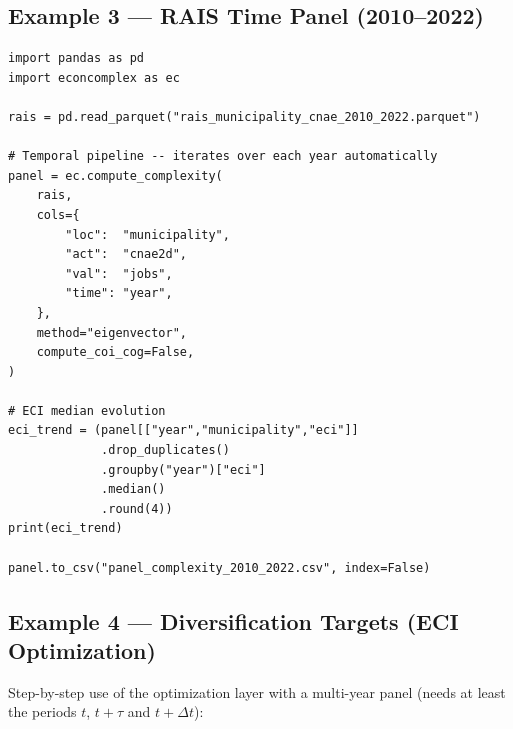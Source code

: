 \documentclass[12pt, a4paper]{article}
\begin{document}
\subsection{Example 3 --- RAIS Time Panel (2010--2022)}

\begin{lstlisting}[caption={Pipeline with panel data --- multiple periods}]
import pandas as pd
import econcomplex as ec

rais = pd.read_parquet("rais_municipality_cnae_2010_2022.parquet")

# Temporal pipeline -- iterates over each year automatically
panel = ec.compute_complexity(
    rais,
    cols={
        "loc":  "municipality",
        "act":  "cnae2d",
        "val":  "jobs",
        "time": "year",
    },
    method="eigenvector",
    compute_coi_cog=False,
)

# ECI median evolution
eci_trend = (panel[["year","municipality","eci"]]
             .drop_duplicates()
             .groupby("year")["eci"]
             .median()
             .round(4))
print(eci_trend)

panel.to_csv("panel_complexity_2010_2022.csv", index=False)
\end{lstlisting}

\subsection{Example 4 --- Diversification Targets (ECI Optimization)}

Step-by-step use of the optimization layer with a multi-year panel
(needs at least the periods $t$, $t+\tau$ and $t+\Delta t$):
\end{document}

